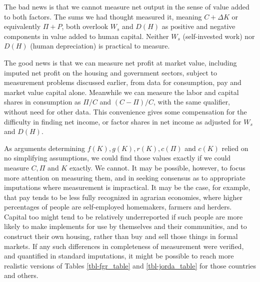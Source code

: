 \documentclass[a4paper,fleqn]{cas-sc}
\begin{document}

The bad news is that we cannot measure net output in the sense of value added to both factors. The sums we had thought measured it, meaning $C + \Delta K$ or equivalently $\Pi + P$, both overlook $W_s$ and $D(H)$ as positive and negative components in value added to human capital. Neither $W_s$ (self-invested work) nor $D(H)$ (human depreciation) is practical to measure.

The good news is that we can measure net profit at market value, including imputed net profit on the housing and government sectors, subject to measurement problems discussed earlier, from data for consumption, pay and market value capital alone. Meanwhile we can measure the labor and capital shares in consumption as $\Pi / C$ and $( C - \Pi ) / C$, with the same qualifier, without need for other data. This convenience gives some compensation for the difficulty in finding net income, or factor shares in net income as adjusted for $W_s$ and $D(H)$.

As arguments determining \(f(K), g(K), r(K), c(\Pi)\) and \(c(K)\) relied on no simplifying assumptions, we could find those values exactly if we could measure \(C, \Pi\) and \(K\) exactly. We cannot. It may be possible, however, to focus more attention on measuring them, and in seeking consensus as to appropriate imputations where measurement is impractical. It may be the case, for example, that pay tends to be less fully recognized in agrarian economies, where higher percentages of people are self-employed homemakers, farmers and herders. Capital too might tend to be relatively underreported if such people are more likely to make implements for use by themselves and their communities, and to construct their own housing, rather than buy and sell those things in formal markets. If any such differences in completeness of measurement were verified, and quantified in standard imputations, it might be possible to reach more realistic versions of Tables \ref{tbl-fgr_table} and \ref{tbl-jorda_table} for those countries and others.


%
%
\printcredits

% 



\end{document}
